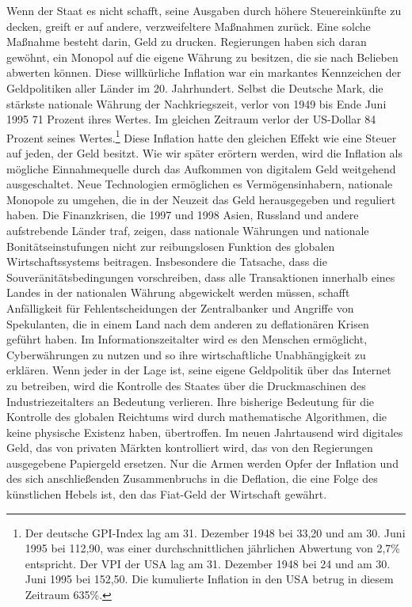 \documentclass[
  a5paper,
  smalldemyvopaper,10pt,twoside,onecolumn,openright,extrafontsizes,hidelinks]{memoir}
\begin{document}
Wenn der Staat es nicht schafft, seine Ausgaben durch höhere
Steuereinkünfte zu decken, greift er auf andere, verzweifeltere
Maßnahmen zurück. Eine solche Maßnahme besteht darin, Geld zu drucken.
Regierungen haben sich daran gewöhnt, ein Monopol auf die eigene Währung
zu besitzen, die sie nach Belieben abwerten können. Diese willkürliche
Inflation war ein markantes Kennzeichen der Geldpolitiken aller Länder
im 20. Jahrhundert. Selbst die Deutsche Mark, die stärkste nationale
Währung der Nachkriegszeit, verlor von 1949 bis Ende Juni 1995 71
Prozent ihres Wertes. Im gleichen Zeitraum verlor der US-Dollar 84
Prozent seines Wertes.\footnote{Der deutsche GPI-Index lag am 31.
  Dezember 1948 bei 33,20 und am 30. Juni 1995 bei 112,90, was einer
  durchschnittlichen jährlichen Abwertung von 2,7\% entspricht. Der VPI
  der USA lag am 31. Dezember 1948 bei 24 und am 30. Juni 1995 bei
  152,50. Die kumulierte Inflation in den USA betrug in diesem Zeitraum
  635\%.} Diese Inflation hatte den gleichen Effekt wie eine Steuer auf
jeden, der Geld besitzt. Wie wir später erörtern werden, wird die
Inflation als mögliche Einnahmequelle durch das Aufkommen von digitalem
Geld weitgehend ausgeschaltet. Neue Technologien ermöglichen es
Vermögensinhabern, nationale Monopole zu umgehen, die in der Neuzeit das
Geld herausgegeben und reguliert haben. Die Finanzkrisen, die 1997 und
1998 Asien, Russland und andere aufstrebende Länder traf, zeigen, dass
nationale Währungen und nationale Bonitätseinstufungen nicht zur
reibungslosen Funktion des globalen Wirtschaftssystems beitragen.
Insbesondere die Tatsache, dass die Souveränitätsbedingungen
vorschreiben, dass alle Transaktionen innerhalb eines Landes in der
nationalen Währung abgewickelt werden müssen, schafft Anfälligkeit für
Fehlentscheidungen der Zentralbanker und Angriffe von Spekulanten, die
in einem Land nach dem anderen zu deflationären Krisen geführt haben. Im
Informationszeitalter wird es den Menschen ermöglicht, Cyberwährungen zu
nutzen und so ihre wirtschaftliche Unabhängigkeit zu erklären. Wenn
jeder in der Lage ist, seine eigene Geldpolitik über das Internet zu
betreiben, wird die Kontrolle des Staates über die Druckmaschinen des
Industriezeitalters an Bedeutung verlieren. Ihre bisherige Bedeutung für
die Kontrolle des globalen Reichtums wird durch mathematische
Algorithmen, die keine physische Existenz haben, übertroffen. Im neuen
Jahrtausend wird digitales Geld, das von privaten Märkten kontrolliert
wird, das von den Regierungen ausgegebene Papiergeld ersetzen. Nur die
Armen werden Opfer der Inflation und des sich anschließenden
Zusammenbruchs in die Deflation, die eine Folge des künstlichen Hebels
ist, den das Fiat-Geld der Wirtschaft gewährt.
\end{document}
